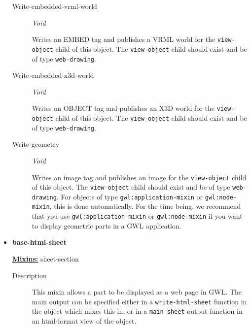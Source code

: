 \documentclass [11pt]{book}
\begin{document}
\begin{itemize}
\begin{description}
\item [Write-embedded-vrml-world]
\emph{Void}

 Writes an EMBED tag and publishes a VRML world for the \texttt{view-object} child of this object.
The \texttt{view-object} child should exist and be of type \texttt{web-drawing}.




\item [Write-embedded-x3d-world]
\emph{Void}

 Writes an OBJECT tag and publishes an X3D world for the \texttt{view-object} child of this object.
The \texttt{view-object} child should exist and be of type \texttt{web-drawing}.




\item [Write-geometry]
\emph{Void}

 Writes an image tag and publishes an image for the \texttt{view-object} child of this object.
The \texttt{view-object} child should exist and be of type \texttt{web-drawing}.
For objects of type \texttt{gwl:application-mixin} or \texttt{gwl:node-mixin}, this is done automatically.
For the time being, we recommend that you use \texttt{gwl:application-mixin} or \texttt{gwl:node-mixin} if you want to
display geometric parts in a GWL application.




\end{description}







\item {}
\label{prim:base-html-sheet}
\textbf{base-html-sheet}


\textbf{
\underline{Mixins:}} sheet-section





\begin{description}

\item [
\underline{Description}]


This mixin allows a part to be displayed as a web page in GWL. 
The main output can be specified either in a \texttt{write-html-sheet} function in the object which
mixes  this in, or in a \texttt{main-sheet} output-function in an html-format view of the 
object.




\end{description}
\end{itemize}
\end{document}
